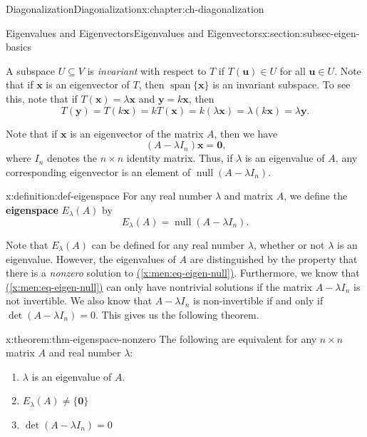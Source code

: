 \documentclass[oneside,10pt,]{book}
\newcommand{\xreffont}{\relax}
\newcommand{\terminology}[1]{\textbf{#1}}
\numberwithin{equation}{section}
\newcommand{\spn}{\operatorname{span}}
\newcommand{\nll}{\operatorname{null}}
\newcommand{\uu}{\mathbf{u}}
\newcommand{\xx}{\mathbf{x}}
\newcommand{\yy}{\mathbf{y}}
\begin{document}
\begin{chapterptx}{Diagonalization}{}{Diagonalization}{}{}{x:chapter:ch-diagonalization}
\begin{sectionptx}{Eigenvalues and Eigenvectors}{}{Eigenvalues and Eigenvectors}{}{}{x:section:subsec-eigen-basics}
\par
A subspace \(U\subseteq V\) is \emph{invariant} with respect to \(T\) if \(T(\uu)\in U\) for all \(\uu\in U\). Note that if \(\xx\) is an eigenvector of \(T\), then \(\spn\{\xx\}\) is an invariant subspace. To see this, note that if \(T(\xx)=\lambda \xx\) and \(\yy=k\xx\), then%
\begin{equation*}
T(\yy)=T(k\xx)=kT(\xx)=k(\lambda \xx)=\lambda(k\xx)=\lambda\yy\text{.}
\end{equation*}
%
\par
Note that if \(\xx\) is an eigenvector of the matrix \(A\), then we have%
\begin{equation}
(A-\lambda I_n)\xx=\mathbf{0}\text{,}\label{x:men:eq-eigen-null}
\end{equation}
where \(I_n\) denotes the \(n\times n\) identity matrix. Thus, if \(\lambda\) is an eigenvalue of \(A\), any corresponding eigenvector is an element of \(\nll(A-\lambda I_n)\).%
\begin{definition}{}{x:definition:def-eigenspace}%
For any real number \(\lambda\) and matrix \(A\), we define the \terminology{eigenspace} \(E_\lambda(A)\) by%
\begin{equation*}
E_\lambda(A) = \nll (A-\lambda I_n)\text{.}
\end{equation*}
%
\end{definition}
Note that \(E_\lambda(A)\) can be defined for any real number \(\lambda\), whether or not \(\lambda\) is an eigenvalue. However, the eigenvalues of \(A\) are distinguished by the property that there is a \emph{nonzero} solution to \hyperref[x:men:eq-eigen-null]{({\xreffont\ref{x:men:eq-eigen-null}})}. Furthermore, we know that \hyperref[x:men:eq-eigen-null]{({\xreffont\ref{x:men:eq-eigen-null}})} can only have nontrivial solutions if the matrix \(A-\lambda I_n\) is not invertible. We also know that \(A-\lambda I_n\) is non-invertible if and only if \(\det (A-\lambda I_n) = 0\). This gives us the following theorem.%
\begin{theorem}{}{}{x:theorem:thm-eigenspace-nonzero}%
The following are equivalent for any \(n\times n\) matrix \(A\) and real number \(\lambda\):%
\begin{enumerate}
\item{}\(\lambda\) is an eigenvalue of \(A\).%
\item{}\(\displaystyle E_\lambda(A)\neq \{\mathbf{0}\}\)%
\item{}\(\displaystyle \det(A-\lambda I_n) = 0\)%
\end{enumerate}

\end{theorem}
\end{sectionptx}
\end{chapterptx}
\end{document}
